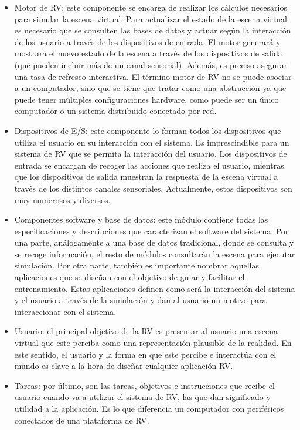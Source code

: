 \begin{itemize}
    \item Motor de \ac{RV}: este componente se encarga de realizar los cálculos necesarios para simular la escena virtual. Para actualizar el estado de la escena virtual es necesario que se consulten las bases de datos y actuar según la interacción de los usuario a través de los dispositivos de entrada. El motor generará y mostrará el nuevo estado de la escena a través de los dispositivos de salida (que pueden incluir más de un canal sensorial). Además, es preciso asegurar una tasa de refresco interactiva. El término motor de \ac{RV} no se puede asociar a un computador, sino que se tiene que tratar como una abstracción ya que puede tener múltiples configuraciones hardware, como puede ser un único computador o un sistema distribuido conectado por red.
    \item Dispositivos de \ac{E/S}: este componente lo forman todos los dispositivos que utiliza el usuario en su interacción con el sistema. Es imprescindible para un sistema de \ac{RV}  que se permita la interacción del usuario. Los dispositivos de entrada se encargan de recoger las acciones que realiza el usuario, mientras que los dispositivos de salida muestran la respuesta de la escena virtual a través de los distintos canales sensoriales. Actualmente, estos dispositivos son muy numerosos y diversos.
    \item Componentes software y base de datos: este módulo contiene todas las especificaciones y descripciones que caracterizan el software del sistema. Por una parte, análogamente a una base de datos tradicional, donde se consulta y se recoge información, el resto de módulos consultarán la escena para ejecutar simulación.
    Por otra parte, también es importante nombrar aquellas aplicaciones que se diseñan con el objetivo de guiar y facilitar el entrenamiento. Estas aplicaciones definen como será la interacción del sistema y el usuario a través de la simulación y dan al usuario un motivo para interaccionar con el sistema.%
    \item Usuario: el principal objetivo de la \ac{RV} es presentar al usuario una escena virtual que este perciba como una representación plausible de la realidad. En este sentido, el usuario y la forma en que este percibe e interactúa con el mundo es clave a la hora de diseñar cualquier aplicación \ac{RV}.
    \item Tareas: por último, son las tareas, objetivos e instrucciones que recibe el usuario cuando va a utilizar el sistema de \ac{RV}, las que dan significado y utilidad a la aplicación. Es lo que diferencia un computador con periféricos conectados de una plataforma de \ac{RV}.
\end{itemize}


